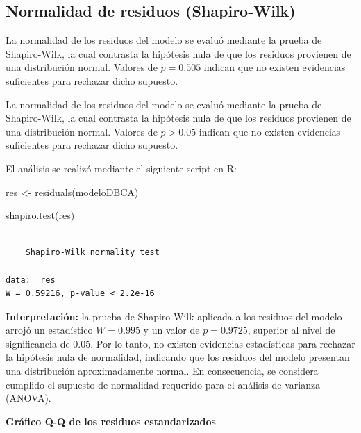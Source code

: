 \documentclass[
  spanish,
  letterpaper,
  DIV=11,
  numbers=noendperiod]{scrreprt}
\newenvironment{Shaded}{\begin{snugshade}}{\end{snugshade}}
\newcommand{\FunctionTok}[1]{\textcolor[rgb]{0.28,0.35,0.67}{#1}}
\newcommand{\NormalTok}[1]{\textcolor[rgb]{0.00,0.23,0.31}{#1}}
\newcommand{\OtherTok}[1]{\textcolor[rgb]{0.00,0.23,0.31}{#1}}
\begin{document}
\subsection{Normalidad de residuos
(Shapiro-Wilk)}\label{normalidad-de-residuos-shapiro-wilk}

La normalidad de los residuos del modelo se evaluó mediante la prueba de
Shapiro-Wilk, la cual contrasta la hipótesis nula de que los residuos
provienen de una distribución normal. Valores de \(p = 0.505\) indican
que no existen evidencias suficientes para rechazar dicho supuesto.

La normalidad de los residuos del modelo se evaluó mediante la prueba de
Shapiro-Wilk, la cual contrasta la hipótesis nula de que los residuos
provienen de una distribución normal. Valores de \(𝑝> 0.05\) indican que
no existen evidencias suficientes para rechazar dicho supuesto.

El análisis se realizó mediante el siguiente script en R:

\begin{Shaded}
\begin{Highlighting}[]
\NormalTok{res }\OtherTok{\textless{}{-}} \FunctionTok{residuals}\NormalTok{(modeloDBCA)}
\end{Highlighting}
\end{Shaded}

\begin{Shaded}
\begin{Highlighting}[]
\FunctionTok{shapiro.test}\NormalTok{(res)}
\end{Highlighting}
\end{Shaded}

\begin{verbatim}

    Shapiro-Wilk normality test

data:  res
W = 0.59216, p-value < 2.2e-16
\end{verbatim}

\textbf{Interpretación:} la prueba de Shapiro-Wilk aplicada a los
residuos del modelo arrojó un estadístico \(W = 0.995\) y un valor de
\(p = 0.9725\), superior al nivel de significancia de 0.05. Por lo
tanto, no existen evidencias estadísticas para rechazar la hipótesis
nula de normalidad, indicando que los residuos del modelo presentan una
distribución aproximadamente normal. En consecuencia, se considera
cumplido el supuesto de normalidad requerido para el análisis de
varianza (ANOVA).

\textbf{Gráfico Q-Q de los residuos estandarizados}
\end{document}
